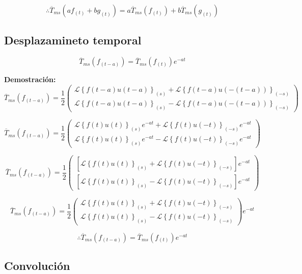 \documentclass[12pt]{article}
\begin{document}
$$
\therefore \overline{T}_{ms}(a f_{(t)} + b g_{(t)}) = a \overline{T}_{ms}(f_{(t)}) + b  \overline{T}_{ms}(g_{(t)})
$$

\subsection{Desplazamineto temporal}

\begin{equation}
 \overline{T}_{ms}(f_{(t-a)}) = \overline{T}_{ms}(f_{(t)}) e^{-at}
\label{desplazamiento_temporal}
\end{equation}

{\bfseries Demostración:}
$$\overline{T}_{ms}(f_{(t-a)}) = \frac12
\begin{pmatrix}
\mathcal{L}\left\{f(t-a)u(t-a)\right\}_{(s)} +  \mathcal{L}\left\{f(t-a)u(-(t-a))\right\}_{(-s)}\\[0.2 cm]
\mathcal{L}\left\{f(t-a)u(t-a)\right\}_{(s)} -  \mathcal{L}\left\{f(t-a)u(-(t-a))\right\}_{(-s)}
\end{pmatrix}$$


$$
\overline{T}_{ms}(f_{(t-a)}) = \frac12
\begin{pmatrix}
\mathcal{L}\left\{f(t)u(t)\right\}_{(s)} e^{-at} +  \mathcal{L}\left\{f(t)u(-t)\right\}_{(-s)} e^{-at} \\[0.2 cm]
\mathcal{L}\left\{f(t)u(t)\right\}_{(s)}  e^{-at} -  \mathcal{L}\left\{f(t)u(-t)\right\}_{(-s)} e^{-at} 
\end{pmatrix}
$$

$$
\overline{T}_{ms}(f_{(t-a)}) = \frac12
\begin{pmatrix}
\left[\mathcal{L}\left\{f(t)u(t)\right\}_{(s)} +  \mathcal{L}\left\{f(t)u(-t)\right\}_{(-s)}\right]e^{-at} \\[0.2 cm]
\left[\mathcal{L}\left\{f(t)u(t)\right\}_{(s)} -  \mathcal{L}\left\{f(t)u(-t)\right\}_{(-s)}\right]e^{-at} 
\end{pmatrix}
$$


$$
\overline{T}_{ms}(f_{(t-a)}) = \frac12
\begin{pmatrix}
\mathcal{L}\left\{f(t)u(t)\right\}_{(s)} +  \mathcal{L}\left\{f(t)u(-t)\right\}_{(-s)}\\[0.2 cm]
\mathcal{L}\left\{f(t)u(t)\right\}_{(s)} -  \mathcal{L}\left\{f(t)u(-t)\right\}_{(-s)}
\end{pmatrix} e^{-at}
$$

$$
\therefore \overline{T}_{ms}(f_{(t-a)}) = \overline{T}_{ms}(f_{(t)}) e^{-at}
$$

\subsection{Convolución}
\end{document}
